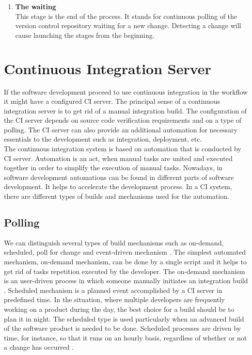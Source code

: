 \begin{enumerate}
    \item \textbf{The waiting}\\[0.1em]
          This stage is the end of the process. It stands for continuous polling of  the version control repository waiting for a new change. Detecting a change will cause launching the stages from the beginning.

\end{enumerate}

\section{Continuous Integration Server}

If the software development proceed to use continuous integration in the workflow it might have a configured CI server. The principal sense of a continuous integration server is to get rid of a manual integration build. The configuration of the CI server depends on source code verification requirements and on a type of polling. The CI server can also provide an additional automation for necessary essentials to the development such as integration, deployment, etc.\\

The continuous integration system is based on automation that is conducted by CI server. Automation is an act, when manual tasks are united and executed together in order to simplify the execution of manual tasks. Nowadays, in software development automations can be found in different parts of software development. It helps to accelerate the development process. In a CI system, there are different types of builds and mechanisms used for the automation.

\subsection{Polling}

We can distinguish several types of build mechanisms such as on-demand, scheduled, poll for change and event-driven mechanism \cite{CIbook}. The simplest automated mechanism, on-demand mechanism, can be done by a single script and it helps to get rid of tasks repetition executed by the developer. The on-demand mechanism is an user-driven process in which someone manually initiates an integration build \cite{CIbook}. Scheduled mechanism is a planned event accomplished by a CI server in predefined time. In the situation, where multiple developers are frequently working on a product during the day, the best choice for a build should be to plan it in night. The scheduled type is used particularly when an advanced build of the software product is needed to be done. Scheduled processes are driven by time, for instance, so that it runs on an hourly basis, regardless of whether or not a change has occurred \cite{CIbook}.\\

